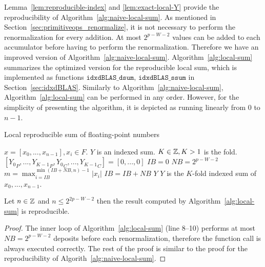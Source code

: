     Lemma~\ref{lem:reproducible-index} and \ref{lem:exact-local-Y} provide the reproducibility
    of Algorithm~\ref{alg:naive-local-sum}.
    As mentioned in Section~\ref{sec:primitiveops_renormalize}, it is not necessary to perform
    the renormalization for every addition. At most $2^{p-W-2}$ values can be added to each
    accumulator before having to perform the renormalization.
    Therefore we have an improved version of Algorithm~\ref{alg:naive-local-sum}.
    Algorithm~\ref{alg:local-sum} summarizes the optimized version for the reproducible local sum,
    which is implemented as functions $\mathtt{idxdBLAS\_dsum}$, $\mathtt{idxdBLAS\_ssum}$
    in Section~\ref{sec:idxdBLAS}.
    Similarly to Algorithm~\ref{alg:naive-local-sum}, Algorithm~\ref{alg:local-sum} can be performed
    in any order. However, for the simplicity of presenting the algorithm, it is depicted
    as running linearly from $0$ to $n-1$.

  \begin{alg}
    Local reproducible sum of floating-point numbers
    \label{alg:local-sum}
    \begin{algorithmic}[1]
      \Require
        $x = [x_0, ..., x_{n - 1}], x_i \in F$.
        $Y$ is an indexed sum.
        $K \in \mathbb{Z}, K > 1$ is the fold.
        \State $[{Y_0}_P, ..., {Y_{K - 1}}_P, {Y_0}_C, ..., {Y_{K - 1}}_C] = [0, ..., 0]$
        \State $IB = 0$
        \State $NB = 2^{p-W-2}$
          \State $m = \max_{i=IB}^{\min(IB+NB,n)-1} |x_i|$
          \State {}
              \State {}
          \EndFor
          \State {}
          \State $IB = IB + NB$
        \EndWhile
        \State \Return $Y$
      \EndFunction
      \Ensure
        \Statex $Y$ is the $K$-fold indexed sum of $x_0, ..., x_{n - 1}$.
    \end{algorithmic}
  \end{alg}

  \begin{thm}
    Let $n \in \mathbb{Z}$ and $n \leq 2^{2p-W-2}$ then the result computed by Algorithm~\ref{alg:local-sum} is reproducible.
  \end{thm}
  \begin{proof}
    The inner loop of Algorithm~\ref{alg:local-sum} (line 8--10) performs at most $NB=2^{p-W-2}$ deposits
    before each renormalization, therefore the  function call is always executed correctly.
    The rest of the proof is similar to the proof for the reproducibility of Algorith~\ref{alg:naive-local-sum}.
  \end{proof}

